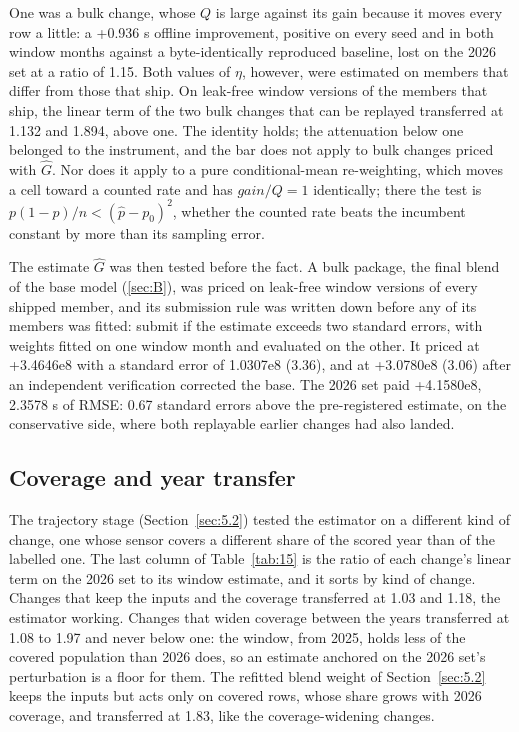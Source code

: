 \documentclass[
  manuscript=article,
  layout=preprint,
  year=2026,
  volume=x,
]{extra/joas}
\begin{document}
One was a bulk change, whose $Q$ is large against its gain because it moves every row a little: a +0.936 s offline improvement, positive on every seed and in both window months against a byte-identically reproduced baseline, lost on the 2026 set at a ratio of 1.15. Both values of $\eta$, however, were estimated on members that differ from those that ship. On leak-free window versions of the members that ship, the linear term of the two bulk changes that can be replayed transferred at 1.132 and 1.894, above one. The identity holds; the attenuation below one belonged to the instrument, and the bar does not apply to bulk changes priced with $\hat{G}$. Nor does it apply to a pure conditional-mean re-weighting, which moves a cell toward a counted rate and has $\mathit{gain}/Q = 1$ identically; there the test is $p(1-p)/n < (\hat{p} - p_0)^2$, whether the counted rate beats the incumbent constant by more than its sampling error.

The estimate $\hat{G}$ was then tested before the fact. A bulk package, the final blend of the base model (\ref{sec:B}), was priced on leak-free window versions of every shipped member, and its submission rule was written down before any of its members was fitted: submit if the estimate exceeds two standard errors, with weights fitted on one window month and evaluated on the other. It priced at +3.4646e8 with a standard error of 1.0307e8 (3.36), and at +3.0780e8 (3.06) after an independent verification corrected the base. The 2026 set paid +4.1580e8, 2.3578 s of RMSE: 0.67 standard errors above the pre-registered estimate, on the conservative side, where both replayable earlier changes had also landed.

\subsection{Coverage and year transfer}\label{sec:E.2}

The trajectory stage (Section~\ref{sec:5.2}) tested the estimator on a different kind of change, one whose sensor covers a different share of the scored year than of the labelled one. The last column of Table~\ref{tab:15} is the ratio of each change's linear term on the 2026 set to its window estimate, and it sorts by kind of change. Changes that keep the inputs and the coverage transferred at 1.03 and 1.18, the estimator working. Changes that widen coverage between the years transferred at 1.08 to 1.97 and never below one: the window, from 2025, holds less of the covered population than 2026 does, so an estimate anchored on the 2026 set's perturbation is a floor for them. The refitted blend weight of Section~\ref{sec:5.2} keeps the inputs but acts only on covered rows, whose share grows with 2026 coverage, and transferred at 1.83, like the coverage-widening changes.
\end{document}
